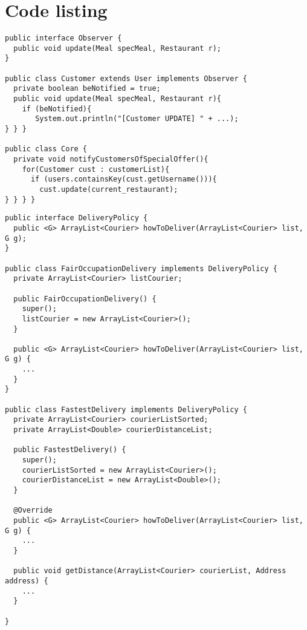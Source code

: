 \section{Code listing} %
\label{app:code_listing}

\lstset{basicstyle=\rm\footnotesize\ttfamily}

\begin{lstlisting}[caption=\emph{Observer} pattern for \texttt{Customer} and \texttt{Meal}.,
label=lst:observer]
public interface Observer {
  public void update(Meal specMeal, Restaurant r);
}

public class Customer extends User implements Observer {
  private boolean beNotified = true;
  public void update(Meal specMeal, Restaurant r){
    if (beNotified){
       System.out.println("[Customer UPDATE] " + ...);
} } }

public class Core {
  private void notifyCustomersOfSpecialOffer(){
    for(Customer cust : customerList){
      if (users.containsKey(cust.getUsername())){
        cust.update(current_restaurant);
} } } }
\end{lstlisting}

\begin{lstlisting}[caption=\emph{Strategy} pattern for the \lstinline|DeliveryPolicy|.,
label=lst:strategy]
public interface DeliveryPolicy {
  public <G> ArrayList<Courier> howToDeliver(ArrayList<Courier> list, G g); 
}

public class FairOccupationDelivery implements DeliveryPolicy {
  private ArrayList<Courier> listCourier;
  
  public FairOccupationDelivery() {
  	super();
  	listCourier = new ArrayList<Courier>();
  }
  
  public <G> ArrayList<Courier> howToDeliver(ArrayList<Courier> list, G g) {
  	...
  }
}

public class FastestDelivery implements DeliveryPolicy {
  private ArrayList<Courier> courierListSorted;
  private ArrayList<Double> courierDistanceList;

  public FastestDelivery() {
  	super();
  	courierListSorted = new ArrayList<Courier>();
  	courierDistanceList = new ArrayList<Double>();
  }
 
  @Override
  public <G> ArrayList<Courier> howToDeliver(ArrayList<Courier> list, G g) {
  	...
  }
  
  public void getDistance(ArrayList<Courier> courierList, Address address) {
    ...
  }
  
}
\end{lstlisting}

